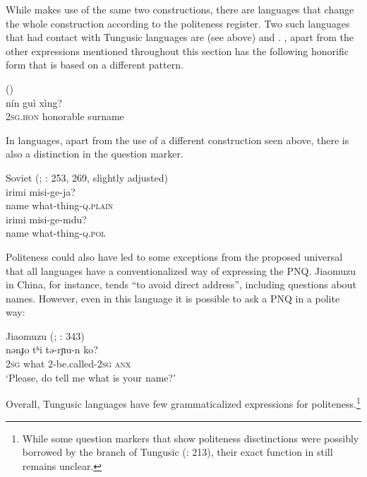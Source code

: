 \documentclass[output=paper,colorlinks,citecolor=brown]{langscibook}
\begin{document}
While  makes use of the same two constructions, there are languages that change the whole construction according to the politeness register. Two such languages that had contact with Tungusic languages are  (see above) and . , apart from the other expressions mentioned throughout this section has the following honorific form that is based on a different pattern.

\ea
    \label{example4.48}
     ()\\
    \gll nín			guì			xìng?\\
    2\textsc{sg.hon}		honorable		surname\\
\z

In  languages, apart from the use of a different construction seen above, there is also a distinction in the question marker.

\ea
    \label{example4.49}
    Soviet  (; \citealt{King1987}: 253, 269, slightly adjusted)\\
    \ea
    \gll irimi	misi-ge-ja?\\
    name	what-thing-\textsc{q.plain}\\

    \ex
    \gll irimi	misi-ge-mdu?\\
    name	what-thing-\textsc{q.pol}\\
    \z
\z

Politeness could also have led to some exceptions from the proposed universal that all languages have a conventionalized way of expressing the PNQ. Jiaomuzu  in China, for instance, tends “to avoid direct address”, including questions about names. However, even in this language it is possible to ask a PNQ in a polite way:

\ea
    \label{example4.50}
    Jiaomuzu  (; \citealt{Prins2017}: 343)\\
    \gll nənɟo	tʰi		tə-rɲu-n			ko?\\
    2\textsc{sg}		what		2-be.called-2\textsc{sg}		\textsc{anx}\\
    \glt ‘Please, do tell me what is your name?’
    \z

\noindent Overall, Tungusic languages have few grammaticalized expressions for politeness.\footnote{While some  question markers that show politeness disctinctions were possibly borrowed by the  branch of Tungusic (\citealt{Hölzl2018a}: 213), their exact function in  still remains unclear.}
\end{document}
